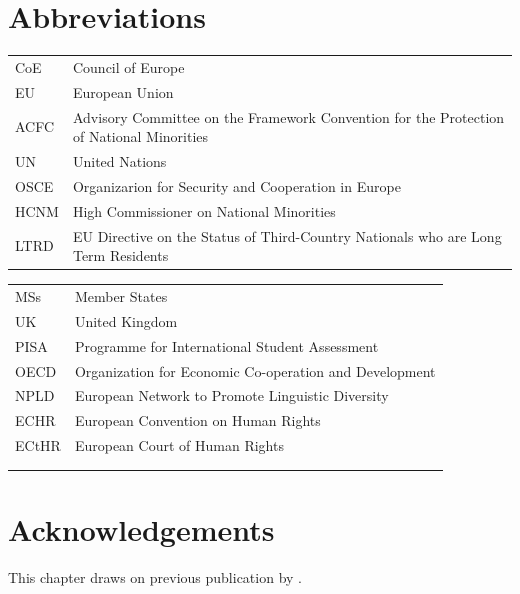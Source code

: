 \documentclass[output=paper,colorlinks,citecolor=brown]{langscibook}
\begin{document}
\section*{Abbreviations}
\begin{tabularx}{.49\textwidth}{@{}lQ@{}}
CoE & Council of Europe \\
EU & European Union \\
ACFC & Advisory Committee on the Framework Convention for the Protection of National Minorities \\
UN & United Nations \\
OSCE & Organizarion for Security and Cooperation in Europe \\
HCNM & High Commissioner on National Minorities \\
LTRD & EU Directive on the Status of Third-Country Nationals who are Long Term Residents \\
\end{tabularx}
\begin{tabularx}{.5\textwidth}{@{}lQ@{}}
MSs & Member States \\
UK & United Kingdom \\
PISA & Programme for International Student Assessment \\
OECD & Organization for Economic Co-operation and Development \\
NPLD & European Network to Promote Linguistic Diversity \\
ECHR & European Convention on Human Rights \\
ECtHR & European Court of Human Rights \\
\\
\\
\end{tabularx}

\section*{Acknowledgements}


This chapter draws on previous publication by .





\sloppy

\printbibliography[heading=subbibliography,notkeyword=this]
\end{document}
